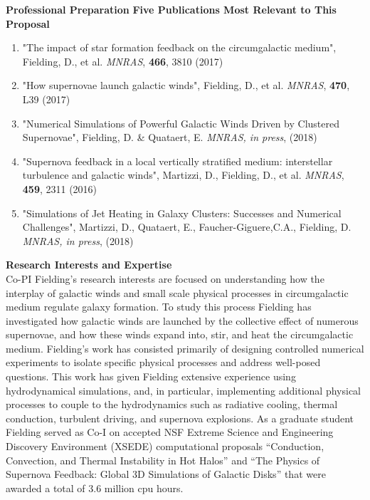 \documentclass[11pt,letterpaper,english]{article}
\begin{document}
\begin{flushleft} {\bf Professional Preparation}
\vspace{.04in}
{\bf Five Publications Most Relevant to This Proposal}
\vspace{-6pt}
\begin{enumerate} \itemsep1pt \parskip0pt 
\item "The impact of star formation feedback on the circumgalactic medium", Fielding, D., et al. \textit{MNRAS}, {\bf 466}, 3810 (2017)\\ 
\item "How supernovae launch galactic winds", Fielding, D., et al. \textit{MNRAS}, {\bf 470}, L39 (2017)\\ 
\item "Numerical Simulations of Powerful Galactic Winds Driven by Clustered Supernovae", Fielding, D. \& Quataert, E. \textit{MNRAS, in press}, (2018)\\ 
\item "Supernova feedback in a local vertically stratified medium: interstellar turbulence and galactic winds", Martizzi, D.,  Fielding, D., et al. \textit{MNRAS}, {\bf 459}, 2311 (2016)\\ 
\item "Simulations of Jet Heating in Galaxy Clusters: Successes and Numerical Challenges", Martizzi, D., Quataert, E., Faucher-Giguere,C.A., Fielding, D. \textit{MNRAS, in press}, (2018)\\ 
\end{enumerate} 

\vspace{-6pt}
{\bf Research Interests and Expertise\\}
{\parindent 16pt
Co-PI Fielding's research interests are focused on understanding how the interplay of galactic winds and small scale physical processes in circumgalactic medium regulate galaxy formation. To study this process Fielding has investigated how galactic winds are launched by the collective effect of numerous supernovae, and how these winds expand into, stir, and heat the circumgalactic medium.
Fielding's work has consisted primarily of designing controlled numerical experiments to isolate specific physical processes and address well-posed questions. This work has given Fielding extensive experience using hydrodynamical simulations, and, in particular, implementing additional physical processes to couple to the hydrodynamics such as radiative cooling, thermal conduction, turbulent driving, and supernova explosions. As a graduate student Fielding served as Co-I on accepted NSF Extreme Science and Engineering Discovery Environment (XSEDE) computational proposals ``Conduction, Convection, and Thermal Instability in Hot Halos'' and ``The Physics of Supernova Feedback: Global 3D Simulations of Galactic Disks''  that were awarded a total of 3.6 million cpu hours. }


\end{flushleft}
\end{document}
